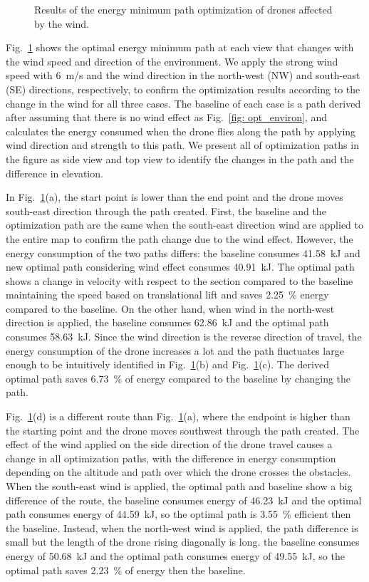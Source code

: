 \documentclass[journal]{./template/IEEEtran}
\begin{document}
\begin{figure}[ht]
\caption{Results of the energy minimum path optimization of drones affected by the wind.}
\label{fig: wind_opt}
\end{figure}

Fig.~\ref{fig: wind_opt} shows the optimal energy minimum path at each view that changes with the wind speed and direction of the environment. 
We apply the strong wind speed with 6~m/s and the wind direction in the north-west (NW) and south-east (SE) directions, respectively, to confirm the optimization results according to the change in the wind for all three cases. 
The baseline of each case is a path derived after assuming that there is no wind effect as Fig.~\ref{fig: opt_environ}, and calculates the energy consumed when the drone flies along the path by applying wind direction and strength to this path. We present all of optimization paths in the figure as side view and top view to identify the changes in the path and the difference in elevation.

In Fig.~\ref{fig: wind_opt}(a), the start point is lower than the end point and the drone moves south-east direction through the path created. 
First, the baseline and the optimization path are the same when the south-east direction wind are applied to the entire map to confirm the path change due to the wind effect. However, the energy consumption of the two paths differs: the baseline consumes 41.58~kJ and new optimal path considering wind effect consumes 40.91~kJ. 
The optimal path shows a change in velocity with respect to the section compared to the baseline maintaining the speed based on translational lift and saves 2.25~\% energy compared to the baseline.
On the other hand, when wind in the north-west direction is applied, the baseline consumes 62.86~kJ and the optimal path consumes 58.63~kJ.
Since the wind direction is the reverse direction of travel, the energy consumption of the drone increases a lot and the path fluctuates large enough to be intuitively identified in Fig.~\ref{fig: wind_opt}(b) and Fig.~\ref{fig: wind_opt}(c). The derived optimal path saves 6.73~\% of energy compared to the baseline by changing the path.

Fig.~\ref{fig: wind_opt}(d) is a different route than Fig.~\ref{fig: wind_opt}(a), where the endpoint is higher than the starting point and the drone moves southwest through the path created. 
The effect of the wind applied on the side direction of the drone travel causes a change in all optimization paths, with the difference in energy consumption depending on the altitude and path over which the drone crosses the obstacles.  
When the south-east wind is applied, the optimal path and baseline show a big difference of the route, the baseline consumes energy of 46.23~kJ and the optimal path consumes energy of 44.59~kJ, so the optimal path is 3.55~\% efficient then the baseline. 
Instead, when the north-west wind is applied, the path difference is small but the length of the drone rising diagonally is long. the baseline consumes energy of 50.68~kJ and the optimal path consumes energy of 49.55~kJ, so the optimal path saves 2.23~\% of energy then the baseline.
\end{document}
